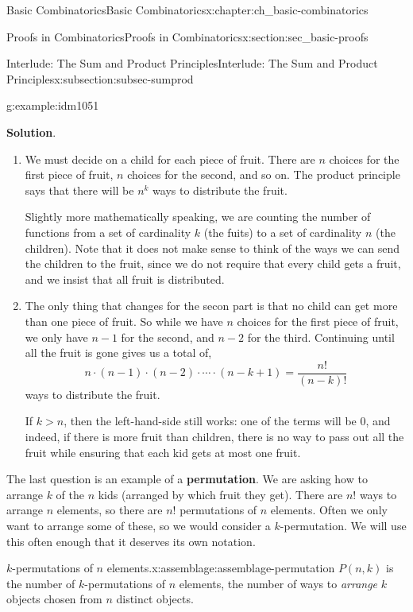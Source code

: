 \documentclass[oneside,10pt,]{book}
\newcommand{\terminology}[1]{\textbf{#1}}
\numberwithin{equation}{chapter}
\newcommand{\gt}{>}
\begin{document}
\begin{chapterptx}{Basic Combinatorics}{}{Basic Combinatorics}{}{}{x:chapter:ch_basic-combinatorics}
\begin{sectionptx}{Proofs in Combinatorics}{}{Proofs in Combinatorics}{}{}{x:section:sec_basic-proofs}
\begin{subsectionptx}{Interlude: The Sum and Product Principles}{}{Interlude: The Sum and Product Principles}{}{}{x:subsection:subsec-sumprod}
\begin{example}{}{g:example:idm1051}
\begin{enumerate}
\end{enumerate}
%
\par\smallskip%
\noindent\textbf{Solution}.\hypertarget{g:solution:idm1065}{}\quad{}%
\begin{enumerate}
\item{}We must decide on a child for each piece of fruit.  There are \(n\) choices for the first piece of fruit, \(n\) choices for the second, and so on.  The product principle says that there will be \(n^k\) ways to distribute the fruit.%
\par
Slightly more mathematically speaking, we are counting the number of functions from a set of cardinality \(k\) (the fuits) to a set of cardinality \(n\) (the children).  Note that it does not make sense to think of the ways we can send the children to the fruit, since we do not require that every child gets a fruit, and we insist that all fruit is distributed.%
\item{}The only thing that changes for the secon part is that no child can get more than one piece of fruit.  So while we have \(n\) choices for the first piece of fruit, we only have \(n-1\) for the second, and \(n-2\) for the third.  Continuing until all the fruit is gone gives us a total of,%
\begin{equation*}
n \cdot (n-1) \cdot (n-2) \cdot \cdots \cdot (n-k+1) = \frac{n!}{(n-k)!} 
\end{equation*}
ways to distribute the fruit.%
\par
If \(k \gt n\), then the left-hand-side still works: one of the terms will be 0, and indeed, if there is more fruit than children, there is no way to pass out all the fruit while ensuring that each kid gets at most one fruit.%
\end{enumerate}
%
\end{example}
The last question is an example of a \terminology{permutation}.  We are asking how to arrange \(k\) of the \(n\) kids (arranged by which fruit they get).  There are \(n!\) ways to arrange \(n\) elements, so there are \(n!\) permutations of \(n\) elements.  Often we only want to arrange some of these, so we would consider a \(k\)-permutation.   We will use this often enough that it deserves its own notation.%
\begin{assemblage}{\(k\)-permutations of \(n\) elements.}{x:assemblage:assemblage-permutation}%
\(P(n,k)\) is the number of \(k\)-permutations of \(n\) elements, the number of ways to \emph{arrange} \(k\) objects chosen from \(n\) distinct objects.%
\begin{equation*}

\end{equation*}
\end{assemblage}
\end{subsectionptx}
\end{sectionptx}
\end{chapterptx}
\end{document}
